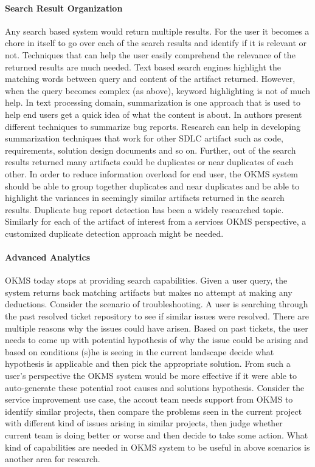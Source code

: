 \paragraph*{Search Result Organization}
Any search based system would return multiple results. For the user it becomes a chore in itself to go over each of the search results and identify if it is relevant or not. Techniques that can help the user easily comprehend the relevance of the returned results are much needed. Text based search engines highlight the matching words between query and content of the artifact returned. However, when the query becomes complex (as above), keyword highlighting is not of much help. In text processing domain, summarization is one approach that is used to help end users get a quick idea of what the content is about. In \cite{Mani:2012,Rastkar:2010} authors present different techniques to summarize bug reports. Research can help in developing summarization techniques that work for other SDLC artifact such as code, requirements, solution design documents and so on. Further, out of the search results returned many artifacts could be duplicates or near duplicates of each other. In order to reduce information overload for end user, the OKMS system should be able to group together duplicates and near duplicates and be able to highlight the variances in seemingly similar artifacts returned in the search results. Duplicate bug report detection \cite{wang2008approach,sun2010discriminative} has been a widely researched topic. Similarly for each of the artifact of interest from a services OKMS perspective, a customized duplicate detection approach might be needed. 

\paragraph*{Advanced Analytics}
OKMS today stops at providing search capabilities. Given a user query, the system returns back matching artifacts but makes no attempt at making any deductions. Consider the scenario of troubleshooting. A user is searching through the past resolved ticket repository to see if similar issues were resolved. There are multiple reasons why the issues could have arisen. Based on past tickets, the user needs to come up with potential hypothesis of why the issue could be arising and based on conditions (s)he is seeing in the current landscape decide what hypothesis is applicable and then pick the appropriate solution. From such a user's perspective the OKMS system would be more effective if it were able to auto-generate these potential root causes and solutions hypothesis. Consider the service improvement use case, the accout team needs support from OKMS to identify similar projects, then compare the problems seen in the current project with different kind of issues arising in similar projects, then judge whether current team is doing better or worse and then decide to take some action. What kind of capabilities are needed in OKMS system to be useful in above scenarios is another area for research. 

